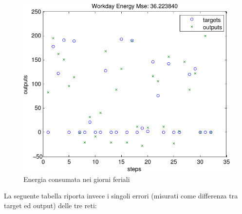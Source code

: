 \begin{figure}[htbp]
  \centering
  \includegraphics[scale=0.5]{images/anfis/workday/energy.pdf}
  \caption{Energia consumata nei giorni feriali}
\end{figure}

La seguente tabella riporta invece i singoli errori (misurati come differenza tra target ed output) delle tre reti:

